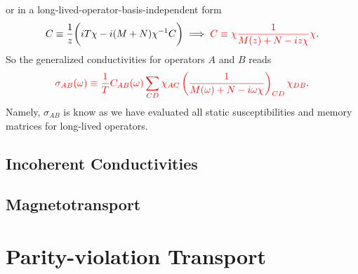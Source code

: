 \documentclass[10pt,nofootinbib,letterpaper]{revtex4}
\begin{document}
			or in a long-lived-operator-basis-independent form
			\begin{equation}\label{1.2.5}
				C\equiv\dfrac{1}{z}\bigg(iT\chi-i(M+N)\chi^{-1}C\bigg)\implies {\color{red}C\equiv\chi\dfrac{1}{M(z)+N-iz\chi}\chi}.
			\end{equation}
			So the generalized conductivities for operators $A$ and $B$ reads
			\begin{equation}\label{1.2.6}
				{\color{red}\sigma_{AB}(\omega)\equiv\dfrac{1}{T}C_{AB}(\omega)\sum_{CD}\chi_{AC}\left(\dfrac{1}{M(\omega)+N-i\omega\chi}\right)_{CD}\chi_{DB}}.
			\end{equation}
			Namely, $\sigma_{AB}$ is know as we have evaluated all static susceptibilities and memory matrices for long-lived operators.

		

	\subsection{Incoherent Conductivities}

	\subsection{Magnetotransport}

\section{Parity-violation Transport}




\end{document}
